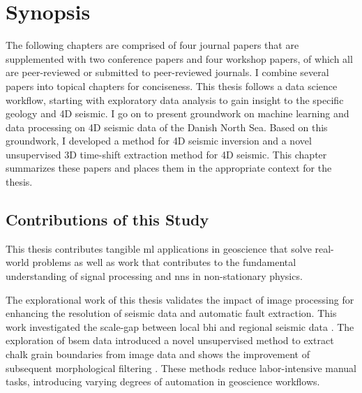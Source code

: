 \chapter{Synopsis}
\label{sec:synopsis}
The following chapters are comprised of four journal papers that are supplemented with two conference papers and four workshop papers, of which all are peer-reviewed or submitted to peer-reviewed journals. I combine several papers into topical chapters for conciseness. This thesis follows a data science workflow, starting with exploratory data analysis to gain insight to the specific geology and 4D seismic. I go on to present groundwork on machine learning and data processing on 4D seismic data of the Danish North Sea. Based on this groundwork, I developed a method for 4D seismic inversion and a novel unsupervised 3D time-shift extraction method for 4D seismic. This chapter summarizes these papers and places them in the appropriate context for the thesis.









\section{Contributions of this Study}

This thesis contributes tangible \acl{ml} applications in geoscience that solve real-world problems as well as work that contributes to the fundamental understanding of signal processing and \aclp{nn} in non-stationary physics.

The explorational work of this thesis validates the impact of image processing for enhancing the resolution of seismic data and automatic fault extraction. This work investigated the scale-gap between local \acl{bhi} and regional seismic data \citep{aabo2017correlation, aabo2018integrated}. The exploration of \acl{bsem} data introduced a novel unsupervised method to extract chalk grain boundaries from image data and shows the improvement of subsequent morphological filtering \citep{dramsch2018gaussian}. These methods reduce labor-intensive manual tasks, introducing varying degrees of automation in geoscience workflows.

